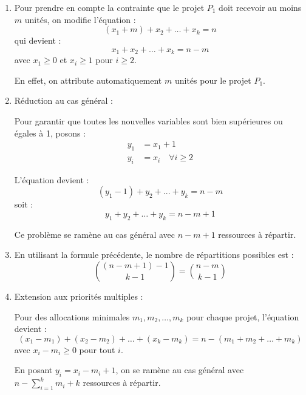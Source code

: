 \documentclass[10pt,a4paper]{article}
\begin{document}
   \begin{enumerate}

      \item Pour prendre en compte la contrainte que le projet $ P_1 $ doit recevoir au moins $m$
      unités, on modifie l'équation :
      $$
      (x_1 + m) + x_2 + \dots + x_k = n
      $$
      qui devient :
      $$
      x_1 + x_2 + \dots + x_k = n - m
      $$
      avec $ x_1 \geq 0 $ et $ x_i \geq 1 $ pour $ i \geq 2 $.

      En effet, on attribute automatiquement $ m $ unités pour le projet $ P_1 $.

      \item Réduction au cas général :

      Pour garantir que toutes les nouvelles variables sont bien supérieures ou égales à 1, posons :
      \begin{align*}
      y_1 &= x_1 + 1 \\
      y_i &= x_i \quad \forall i \geq 2
      \end{align*}

      L'équation devient :
      $$
      (y_1 - 1) + y_2 + ... + y_k = n - m
      $$
      soit :
      $$
      y_1 + y_2 + \dots + y_k = n - m + 1
      $$

      Ce problème se ramène au cas général avec $ n - m + 1 $ ressources à répartir.

      \item En utilisant la formule précédente, le nombre de répartitions possibles est :
      $$
      \binom{(n-m+1)-1}{k-1} = \binom{n-m}{k-1}
      $$

      \item Extension aux priorités multiples :

      Pour des allocations minimales $ m_1, m_2, \dots, m_k $ pour chaque projet, l'équation
      devient :
      $$
      (x_1 - m_1) + (x_2 - m_2) + \dots + (x_k - m_k) = n - (m_1 + m_2 + \dots + m_k)
      $$
      avec $ x_i - m_i \geq 0 $ pour tout $ i $.

      En posant $ y_i = x_i - m_i + 1 $, on se ramène au cas général avec $ n - \sum_{i=1}^k m_i + k $
      ressources à répartir.

   \end{enumerate}
\end{document}
